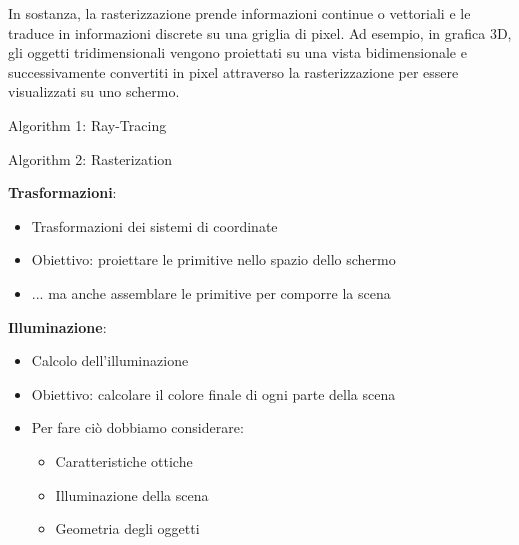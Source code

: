 In sostanza, la rasterizzazione prende informazioni continue o vettoriali e le traduce in informazioni discrete su una griglia di pixel. Ad esempio, in grafica 3D, gli oggetti tridimensionali vengono proiettati su una vista bidimensionale e successivamente convertiti in pixel attraverso la rasterizzazione per essere visualizzati su uno schermo.
    \begin{minipage}{0.45\textwidth}
        \begin{algorithm}[H]
        \SetAlgoLined
        \caption{Algorithm 1: Ray-Tracing}
        \end{algorithm}
        \end{minipage}
        \hfill
        \begin{minipage}{0.45\textwidth}
        \begin{algorithm}[H]
        \SetAlgoLined
        \caption{Algorithm 2: Rasterization}
        \end{algorithm}
        \end{minipage}
\textbf{Trasformazioni}:
\begin{itemize}
    \item Trasformazioni dei sistemi di coordinate
    \item Obiettivo: proiettare le primitive nello spazio dello schermo
    \item ... ma anche assemblare le primitive per comporre la scena
\end{itemize}
\textbf{Illuminazione}:
\begin{itemize}
    \item Calcolo dell'illuminazione
    \item Obiettivo: calcolare il colore finale di ogni parte della scena
    \item Per fare ciò dobbiamo considerare:
    \begin{itemize}
        \item Caratteristiche ottiche
        \item Illuminazione della scena
        \item Geometria degli oggetti
    \end{itemize}
\end{itemize}
